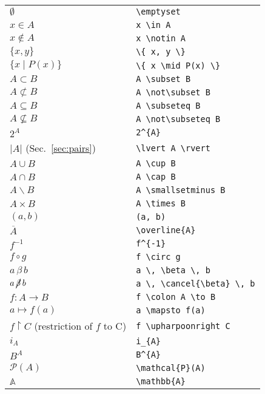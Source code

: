 \documentclass[a4paper,10pt,landscape]{article}
\theoremstyle{definition}
\theoremstyle{remark}
\newcommand{\refsec}[1]{Sec.~\ref{#1}}
\begin{document}
\begin{multicols}{3}
\begin{tabular}{@{}ll@{}}
	$\emptyset$	&\verb!\emptyset!\\
	$x \in A$	&\verb!x \in A!\\
	$x \notin A$	&\verb!x \notin A!\\
	$\{ x, y \}$	& \verb!\{ x, y \}!\\
	$\{ x \mid P(x) \}$	&\verb!\{ x \mid P(x) \}!\\
	$A \subset B$	&\verb!A \subset B!\\
	$A \not\subset B$	&\verb!A \not\subset B!\\
	$A \subseteq B$	&\verb!A \subseteq B!\\
	$A \not\subseteq B$	&\verb!A \not\subseteq B!\\
	$2^{A}$	&\verb!2^{A}!\\
	$\lvert A \rvert$ (\refsec{sec:pairs})	&\verb!\lvert A \rvert!\\
	$A \cup B$	&\verb!A \cup B!\\
	$A \cap B$	&\verb!A \cap B!\\
	$A \smallsetminus B$	&\verb!A \smallsetminus B!\\
	$A \times B$	&\verb!A \times B!\\
	$(a, b)$	&\verb!(a, b)!\\
%	
	$\overline{A}$	&\verb!\overline{A}!\\
	$f^{-1}$	&\verb!f^{-1}!\\
	$f \circ g$	&\verb!f \circ g!\\
	$a \, \beta \, b$	&\verb!a \, \beta \, b!\\
	$a \, \cancel{\beta} \, b$	&\verb!a \, \cancel{\beta} \, b!\\
	$f \colon A \to B$	&\verb!f \colon A \to B!\\
	$a \mapsto f(a)$	&\verb!a \mapsto f(a)!\\
	$f \upharpoonright C$	 (restriction of $f$ to C)	&\verb!f \upharpoonright C!\\
	$i_{A}$	&\verb!i_{A}!\\
	$B^{A}$	&\verb!B^{A}!\\
	$\mathcal{P}(A)$	&\verb!\mathcal{P}(A)!\\
	$\mathbb{A}$	&\verb!\mathbb{A}!\\
\end{tabular}





\end{multicols}
\end{document}

